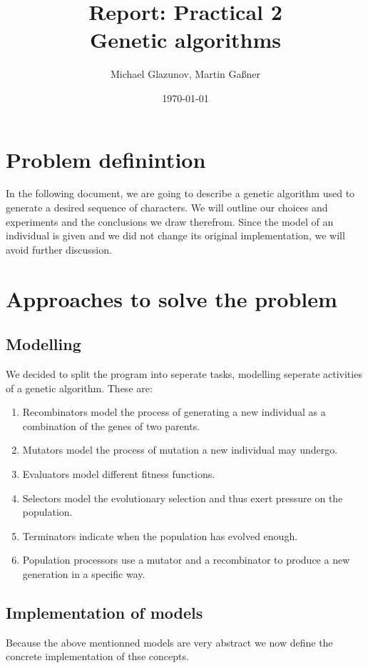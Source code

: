 \documentclass[a4paper,10pt]{article}
\title{Report: Practical 2 \\ Genetic algorithms}
\author{Michael Glazunov, Martin Gaßner}
\date{\today}
\begin{document}
\maketitle

\newpage
{}

\section{Problem definintion}
In the following document, we are going to describe a genetic algorithm used to generate a desired sequence of characters. We will outline our choices and experiments and the conclusions we draw therefrom.\newline
Since the model of an individual is given and we did not change its original implementation, we will avoid further discussion.

\section{Approaches to solve the problem}
\subsection{Modelling}
We decided to split the program into seperate tasks, modelling seperate activities of a genetic algorithm. These are:
\begin{enumerate}
 \item Recombinators model the process of generating a new individual as a combination of the genes of two parents.
 \item Mutators model the process of mutation a new individual may undergo.
 \item Evaluators model different fitness functions.
 \item Selectors model the evolutionary selection and thus exert pressure on the population.
 \item Terminators indicate when the population has evolved enough.
 \item Population processors use a mutator and a recombinator to produce a new generation in a specific way.
\end{enumerate}
\subsection{Implementation of models}
Because the above mentionned models are very abstract we now define the concrete implementation of thse concepts.
\end{document}
